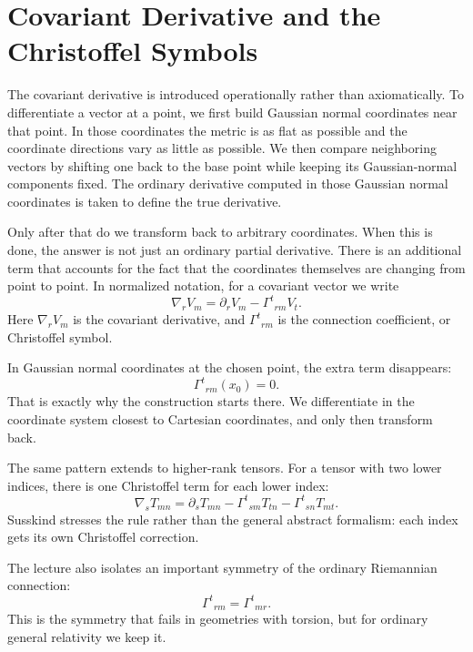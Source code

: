 \section{Covariant Derivative and the Christoffel Symbols}

The covariant derivative is introduced operationally rather than axiomatically. To differentiate a vector at a point, we first build Gaussian normal coordinates near that point. In those coordinates the metric is as flat as possible and the coordinate directions vary as little as possible. We then compare neighboring vectors by shifting one back to the base point while keeping its Gaussian-normal components fixed. The ordinary derivative computed in those Gaussian normal coordinates is taken to define the true derivative.

Only after that do we transform back to arbitrary coordinates. When this is done, the answer is not just an ordinary partial derivative. There is an additional term that accounts for the fact that the coordinates themselves are changing from point to point. In normalized notation, for a covariant vector we write
\begin{equation}
\nabla_r V_m = \partial_r V_m - \Gamma^{t}{}_{rm}V_t.
\end{equation}
Here \(\nabla_r V_m\) is the covariant derivative, and \(\Gamma^{t}{}_{rm}\) is the connection coefficient, or Christoffel symbol.

In Gaussian normal coordinates at the chosen point, the extra term disappears:
\begin{equation}
\Gamma^{t}{}_{rm}(x_0)=0.
\end{equation}
That is exactly why the construction starts there. We differentiate in the coordinate system closest to Cartesian coordinates, and only then transform back.

The same pattern extends to higher-rank tensors. For a tensor with two lower indices, there is one Christoffel term for each lower index:
\begin{equation}
\nabla_s T_{mn}
=
\partial_s T_{mn}
-\Gamma^{t}{}_{sm}T_{tn}
-\Gamma^{t}{}_{sn}T_{mt}.
\end{equation}
Susskind stresses the rule rather than the general abstract formalism: each index gets its own Christoffel correction.

The lecture also isolates an important symmetry of the ordinary Riemannian connection:
\begin{equation}
\Gamma^{t}{}_{rm}=\Gamma^{t}{}_{mr}.
\end{equation}
This is the symmetry that fails in geometries with torsion, but for ordinary general relativity we keep it.

